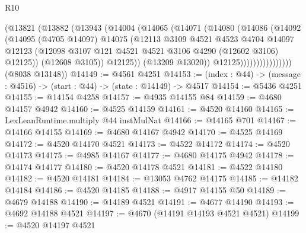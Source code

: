 \begin{lexlean}{R10}
\begin{coremodule}
                          (@13821
                            (@13882
                              (@13943
                                (@14004
                                  (@14065
                                    (@14071
                                      (@14080
                                        (@14086
                                          (@14092
                                            (@14095
                                              (@4705 @14097)
                                              @14075
                                              (@12113
                                                @3109
                                                @4521
                                                @4523
                                                @4704
                                                @14097
                                                @12123
                                                (@12098
                                                  @3107
                                                  @121
                                                  @4521
                                                  @4521
                                                  @3106
                                                  @4290
                                                  (@12602 @3106)
                                                  @12125))
                                              (@12608 @3105))
                                            @12125))
                                        (@13209 @13020))
                                      @12125))))))))))))))))
      (@8038 @13148))
@14149 := @4561 @4251
@14153 := (index : @44) -> (message : @4516) -> (start : @44) -> (state : @14149) -> @4517
@14154 := @5436 @4251
@14155 := @14154 @4258
@14157 := @4935 @14155 @84
@14159 := @4680 @14157 @4942
@14160 := @4525 @14159
@14161 := @4520 @14160
@14165 := LexLeanRuntime.multiply @44 instMulNat
@14166 := @14165 @701
@14167 := @14166 @14155
@14169 := @4680 @14167 @4942
@14170 := @4525 @14169
@14172 := @4520 @14170 @4521
@14173 := @4522 @14172
@14174 := @4520 @14173
@14175 := @4985 @14167
@14177 := @4680 @14175 @4942
@14178 := @14174 @14177
@14180 := @4520 @14178 @4521
@14181 := @4522 @14180
@14182 := @4520 @14181
@14184 := @13053 @4762 @14175
@14185 := @14182 @14184
@14186 := @4520 @14185
@14188 := @4917 @14155 @50
@14189 := @4679 @14188
@14190 := @14189 @4521
@14191 := @4677 @14190
@14193 := @4692 @14188 @4521
@14197 := @4670 (@14191 @14193 @4521 @4521)
@14199 := @4520 @14197 @4521

\end{coremodule}
\end{lexlean}
